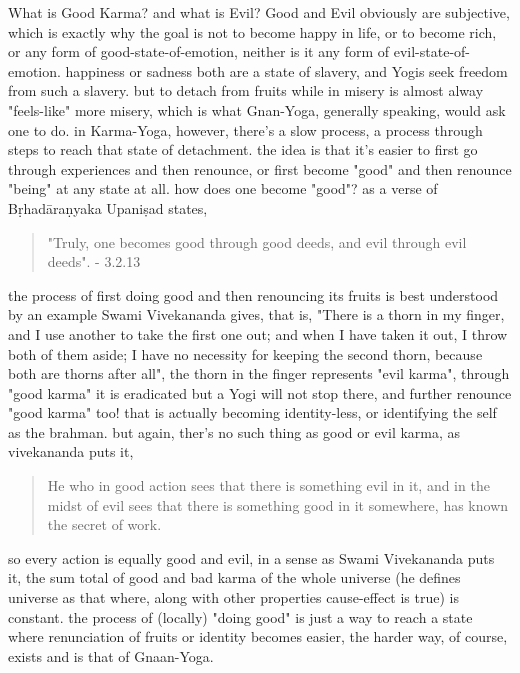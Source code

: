 \documentclass[a4paper]{article}
\begin{document}
What is Good Karma? and what is Evil? Good and Evil obviously are subjective, which is exactly why
the goal is not to become happy in life, or to become rich, or any form of good-state-of-emotion, 
neither is it any form of evil-state-of-emotion. happiness or sadness both are a state of slavery,
and Yogis seek freedom from such a slavery. but to detach from fruits while in misery is almost alway 
"feels-like" more misery, which is what Gnan-Yoga, generally speaking, would ask one to do. in Karma-Yoga,
however, there's a slow process, a process through steps to reach that state of detachment. the idea is that 
it's easier to first go through experiences and then renounce, or first become "good" and then 
renounce "being" at any state at all. how does one become "good"? as a verse of Bṛhadāraṇyaka Upaniṣad states, 
\begin{quote}
"Truly, one becomes good through good deeds, and evil through evil deeds". - 3.2.13
\end{quote}
the process of first doing good and then renouncing its fruits is best understood by an example Swami
Vivekananda gives, that is, "There is a thorn in my finger, and I use another to take the first one 
out; and when I have taken it out, I throw both of them aside; I have no necessity for keeping the 
second thorn, because both are thorns after all", the thorn in the finger represents "evil karma",
through "good karma" it is eradicated but a Yogi will not stop there, and further renounce "good karma"
too! that is actually becoming identity-less, or identifying the self as the brahman. but again,
ther's no such thing as good or evil karma, as vivekananda puts it,
\begin{quote}
    He who in good action sees that there is something evil in it, and in the midst of evil sees that there is something good in it somewhere, has known the secret of work.
\end{quote}
so every action is equally good and evil, in a sense as Swami Vivekananda puts it, the sum total of 
good and bad karma of the whole universe (he defines universe as that where, along with other properties
cause-effect is true) is constant. the process of (locally) "doing good" is just a way to reach a
state where renunciation of fruits or identity becomes easier, the harder way, of course, exists and is that 
of Gnaan-Yoga.
\end{document}
